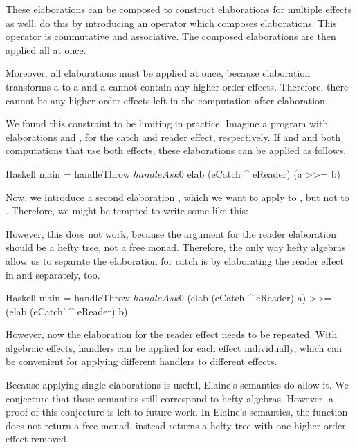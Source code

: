 These elaborations can be composed to construct elaborations for multiple effects as well. \textcite{bach_poulsen_hefty_2023} do this by introducing an operator \hs{^} which composes elaborations. This operator is commutative and associative. The composed elaborations are then applied all at once. 

Moreover, all elaborations must be applied at once, because elaboration transforms a  to a  and a  cannot contain any higher-order effects. Therefore, there cannot be any higher-order effects left in the computation after elaboration.

We found this constraint to be limiting in practice. Imagine a program with elaborations  and , for the catch and reader effect, respectively. If  and  and both computations that use both effects, these elaborations can be applied as follows.

\begin{lst}{Haskell}
main = handleThrow $ handleAsk 0 $
  elab (eCatch ^ eReader) (a >>= b)
\end{lst}
%
Now, we introduce a second elaboration , which we want to apply to , but not to . Therefore, we might be tempted to write some like this:

%
However, this does not work, because the argument for the reader elaboration should be a hefty tree, not a free monad. Therefore, the only way hefty algebras allow us to separate the elaboration for catch is by elaborating the reader effect in  and  separately, too.

\begin{lst}{Haskell}
main = handleThrow $ handleAsk 0 $
  (elab (eCatch ^ eReader) a)
    >>= (elab (eCatch' ^ eReader) b)
\end{lst}
%
However, now the elaboration for the reader effect needs to be repeated. With algebraic effects, handlers can be applied for each effect individually, which can be convenient for applying different handlers to different effects.

Because applying single elaborations is useful, Elaine's semantics do allow it. We conjecture that these semantics still correspond to hefty algebras. However, a proof of this conjecture is left to future work. In Elaine's semantics, the  function does not return a free monad, instead returns a hefty tree with one higher-order effect removed.

